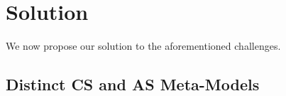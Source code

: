\documentclass{llncs}
\begin{document}



\section{Solution}
\label{sec:solution}

We now propose our solution to the aforementioned challenges.

\subsection{Distinct CS and AS Meta-Models}

\end{document}
